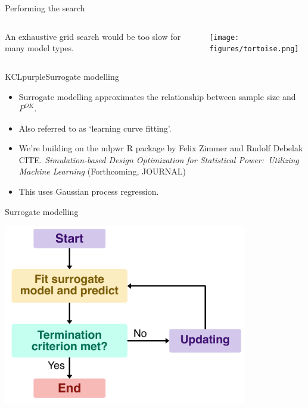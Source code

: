 \documentclass[11pt]{beamer}
\begin{document}
\begin{frame}[t]{Performing the search}

	\vspace{-1em}

	\begin{columns}
		\begin{column}[c]{0.55\textwidth}
			\centering
			An exhaustive grid search would be too slow for many model types.
		\end{column}
		\begin{column}[c]{0.30\textwidth}
			\texttt{[image: figures/tortoise.png]}
		\end{column}
	\end{columns}

	\vspace{-1.5em}

	\begin{cbox}{KCLpurple}{Surrogate modelling}


		\begin{itemize}
			\item Surrogate modelling approximates the relationship between
			      sample size and $P^{OK}$.
			\item Also referred to as `learning curve
			      fitting'\autocite{figueroa2012, dayimu2023}.
              \item We're building on the mlpwr R package by Felix Zimmer and Rudolf Debelak CITE.
              \emph{Simulation-based Design Optimization for Statistical Power:\ Utilizing Machine Learning} (Forthcoming, JOURNAL)
              \item This uses Gaussian process regression.
		\end{itemize}
	\end{cbox}
\end{frame}

\begin{frame}[c]{Surrogate modelling}

    \centering
    \includegraphics[width=0.8\textwidth]{figures/surrogate_algorithm.pdf}

\end{frame}
\end{document}
